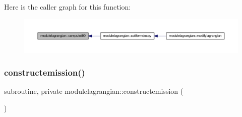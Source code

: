 Here is the caller graph for this function\+:\nopagebreak
\begin{figure}[H]
\begin{center}
\leavevmode
\includegraphics[width=350pt]{namespacemodulelagrangian_ab2c379c41effe9b3eef3129449039ace_icgraph}
\end{center}
\end{figure}
\mbox{\label{namespacemodulelagrangian_ac0e529585f9aa6d77944f42eec49c399}} 
\subsubsection{\texorpdfstring{constructemission()}{constructemission()}}
{\footnotesize\ttfamily subroutine, private modulelagrangian\+::constructemission (\begin{DoxyParamCaption}{ }\end{DoxyParamCaption})\hspace{0.3cm}{\ttfamily [private]}}

